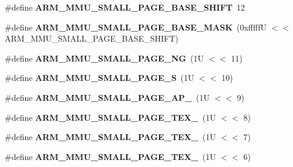 \begin{DoxyCompactItemize}
\mbox{\label{group__RTEMSScoreCPUARMCP15_ga2f843dafdbc993e729bfd844cbd484a8}} 
\#define {\bfseries A\+R\+M\+\_\+\+M\+M\+U\+\_\+\+S\+M\+A\+L\+L\+\_\+\+P\+A\+G\+E\+\_\+\+B\+A\+S\+E\+\_\+\+S\+H\+I\+FT}~12
\item 
\mbox{\label{group__RTEMSScoreCPUARMCP15_gaf9d9678587739337da87fb3f797d012f}} 
\#define {\bfseries A\+R\+M\+\_\+\+M\+M\+U\+\_\+\+S\+M\+A\+L\+L\+\_\+\+P\+A\+G\+E\+\_\+\+B\+A\+S\+E\+\_\+\+M\+A\+SK}~(0xfffff\+U $<$$<$ A\+R\+M\+\_\+\+M\+M\+U\+\_\+\+S\+M\+A\+L\+L\+\_\+\+P\+A\+G\+E\+\_\+\+B\+A\+S\+E\+\_\+\+S\+H\+I\+F\+T)
\item 
\mbox{\label{group__RTEMSScoreCPUARMCP15_ga7663e29b6f98db8ce16fdc2dae1f8a07}} 
\#define {\bfseries A\+R\+M\+\_\+\+M\+M\+U\+\_\+\+S\+M\+A\+L\+L\+\_\+\+P\+A\+G\+E\+\_\+\+NG}~(1\+U $<$$<$ 11)
\item 
\mbox{\label{group__RTEMSScoreCPUARMCP15_ga730e9e4cbcb0c6ef9c43995199ec5c11}} 
\#define {\bfseries A\+R\+M\+\_\+\+M\+M\+U\+\_\+\+S\+M\+A\+L\+L\+\_\+\+P\+A\+G\+E\+\_\+S}~(1\+U $<$$<$ 10)
\item 
\mbox{\label{group__RTEMSScoreCPUARMCP15_ga59938d266aa8acfa648ab125b78f4055}} 
\#define {\bfseries A\+R\+M\+\_\+\+M\+M\+U\+\_\+\+S\+M\+A\+L\+L\+\_\+\+P\+A\+G\+E\+\_\+\+A\+P\+\_}~(1\+U $<$$<$ 9)
\item 
\mbox{\label{group__RTEMSScoreCPUARMCP15_ga9ee3d6c82e05f92a46ac839e8b50a17b}} 
\#define {\bfseries A\+R\+M\+\_\+\+M\+M\+U\+\_\+\+S\+M\+A\+L\+L\+\_\+\+P\+A\+G\+E\+\_\+\+T\+E\+X\+\_}~(1\+U $<$$<$ 8)
\item 
\mbox{\label{group__RTEMSScoreCPUARMCP15_gae101e8cb012476f6531f34e08c76160c}} 
\#define {\bfseries A\+R\+M\+\_\+\+M\+M\+U\+\_\+\+S\+M\+A\+L\+L\+\_\+\+P\+A\+G\+E\+\_\+\+T\+E\+X\+\_}~(1\+U $<$$<$ 7)
\item 
\mbox{\label{group__RTEMSScoreCPUARMCP15_ga659ae66a8a98ee8f39c89375f6d53622}} 
\#define {\bfseries A\+R\+M\+\_\+\+M\+M\+U\+\_\+\+S\+M\+A\+L\+L\+\_\+\+P\+A\+G\+E\+\_\+\+T\+E\+X\+\_}~(1\+U $<$$<$ 6)
$$
\end{DoxyCompactItemize}
